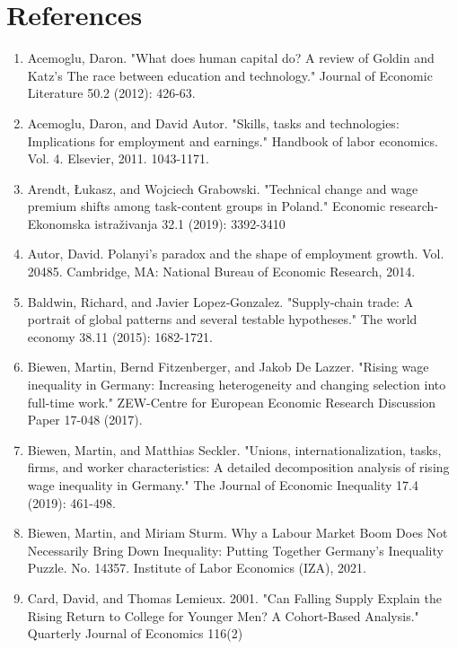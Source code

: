 \documentclass{article}
\begin{document}
\section{References}
\begin{enumerate}
\item Acemoglu, Daron. "What does human capital do? A review of Goldin and Katz's The race between education and technology." Journal of Economic Literature 50.2 (2012): 426-63.

\item Acemoglu, Daron, and David Autor. "Skills, tasks and technologies: Implications for employment and earnings." Handbook of labor economics. Vol. 4. Elsevier, 2011. 1043-1171.

\item Arendt, Łukasz, and Wojciech Grabowski. "Technical change and wage premium shifts among task-content groups in Poland." Economic research-Ekonomska istraživanja 32.1 (2019): 3392-3410

\item Autor, David. Polanyi's paradox and the shape of employment growth. Vol. 20485. Cambridge, MA: National Bureau of Economic Research, 2014.

\item Baldwin, Richard, and Javier Lopez‐Gonzalez. "Supply‐chain trade: A portrait of global patterns and several testable hypotheses." The world economy 38.11 (2015): 1682-1721.

\item Biewen, Martin, Bernd Fitzenberger, and Jakob De Lazzer. "Rising wage inequality in Germany: Increasing heterogeneity and changing selection into full-time work." ZEW-Centre for European Economic Research Discussion Paper 17-048 (2017).

\item Biewen, Martin, and Matthias Seckler. "Unions, internationalization, tasks, firms, and worker characteristics: A detailed decomposition analysis of rising wage inequality in Germany." The Journal of Economic Inequality 17.4 (2019): 461-498.

\item Biewen, Martin, and Miriam Sturm. Why a Labour Market Boom Does Not Necessarily Bring Down Inequality: Putting Together Germany's Inequality Puzzle. No. 14357. Institute of Labor Economics (IZA), 2021.

\item Card, David, and Thomas Lemieux. 2001. "Can Falling Supply Explain the Rising Return to College for Younger Men? A Cohort-Based Analysis." Quarterly Journal of Economics 116(2)


\end{enumerate}
\end{document}
